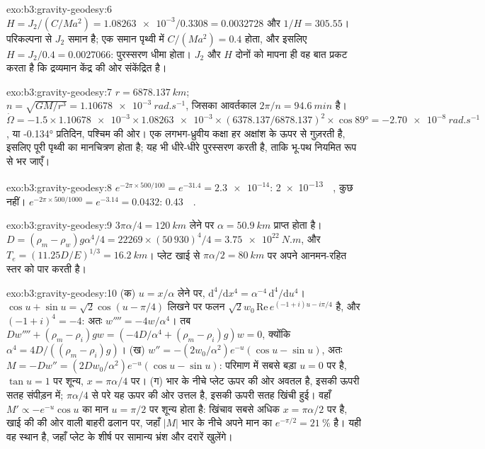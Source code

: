 \begin{solution}{exo:b3:gravity-geodesy:6}
$H = J_2/(C/Ma^2) = \num{1.08263e-3}/0.3308 = \num{0.0032728}$ और
$1/H = 305.55$। परिकल्पना से $J_2$ समान है; एक समान पृथ्वी में
$C/(Ma^2) = 0.4$ होता, और इसलिए $H = J_2/0.4 = \num{0.0027066}$: पुरस्सरण
धीमा होता। $J_2$ और $H$ दोनों को मापना ही वह बात प्रकट करता है कि द्रव्यमान
केंद्र की ओर संकेंद्रित है।
\end{solution}

\begin{solution}{exo:b3:gravity-geodesy:7}
$r = \qty{6878.137}{km}$; $n = \sqrt{GM/r^3} = \qty{1.10678e-3}{rad.s^{-1}}$, जिसका
आवर्तकाल $2\pi/n = \qty{94.6}{min}$ है। $\dot\Omega = -1.5\times\num{1.10678e-3}
\times\num{1.08263e-3}\times(6378.137/6878.137)^2\times\cos\ang{89} =
\qty{-2.70e-8}{rad.s^{-1}}$, या \ang{-0.134} प्रतिदिन, पश्चिम की ओर। एक लगभग-ध्रुवीय कक्षा
हर अक्षांश के ऊपर से गुज़रती है, इसलिए पूरी पृथ्वी का मानचित्रण होता है; यह भी
धीरे-धीरे पुरस्सरण करती है, ताकि भू-पथ नियमित रूप से भर जाएँ।
\end{solution}

\begin{solution}{exo:b3:gravity-geodesy:8}
$e^{-2\pi\times500/100} = e^{-31.4} = \num{2.3e-14}$: \qty{2e-13}{\milli\gal},
कुछ नहीं। $e^{-2\pi\times500/1000} = e^{-3.14} = 0.0432$:
\qty{0.43}{\milli\gal}.
\end{solution}

\begin{solution}{exo:b3:gravity-geodesy:9}
$3\pi\alpha/4 = \qty{120}{km}$ लेने पर $\alpha = \qty{50.9}{km}$ प्राप्त होता है।
$D = (\rho_m - \rho_w)g\alpha^4/4 = 22269\times(50\,930)^4/4 =
\qty{3.75e22}{N.m}$, और $T_e = (11.25D/E)^{1/3} = \qty{16.2}{km}$। प्लेट
खाई से $\pi\alpha/2 = \qty{80}{km}$ पर अपने आनमन-रहित स्तर को पार करती है।
\end{solution}

\begin{solution}{exo:b3:gravity-geodesy:10}
(क) $u = x/\alpha$ लेने पर, $\mathrm d^4/\mathrm dx^4 = \alpha^{-4}\,\mathrm
d^4/\mathrm du^4$। $\cos u + \sin u = \sqrt2\cos(u - \pi/4)$ लिखने पर
फलन $\sqrt2w_0\,\mathrm{Re}\,e^{(-1 + i)u - i\pi/4}$ है, और
$(-1 + i)^4 = -4$: अतः $w'''' = -4w/\alpha^4$। तब $Dw'''' + (\rho_m -
\rho_i)gw = (-4D/\alpha^4 + (\rho_m - \rho_i)g)w = 0$, क्योंकि $\alpha^4 =
4D/((\rho_m - \rho_i)g)$। (ख) $w'' = -(2w_0/\alpha^2)e^{-u}(\cos u - \sin u)$, अतः
$M = -Dw'' = (2Dw_0/\alpha^2)e^{-u}(\cos u - \sin u)$: परिमाण में सबसे बड़ा
$u = 0$ पर है, $\tan u = 1$ पर शून्य, $x = \pi\alpha/4$ पर। (ग) भार के नीचे प्लेट
ऊपर की ओर अवतल है, इसकी ऊपरी सतह संपीड़न में; $\pi\alpha/4$ से परे
यह ऊपर की ओर उत्तल है, इसकी ऊपरी सतह खिंची हुई। वहाँ $M' \propto
-e^{-u}\cos u$ का मान $u = \pi/2$ पर शून्य होता है: खिंचाव सबसे अधिक
$x = \pi\alpha/2$ पर है, खाई की  की ओर वाली बाहरी ढलान पर, जहाँ
$|M|$ भार के नीचे अपने मान का $e^{-\pi/2} = \qty{21}{\percent}$ है। यही वह स्थान है,
जहाँ प्लेट के शीर्ष पर सामान्य भ्रंश और दरारें खुलेंगे।
\end{solution}

